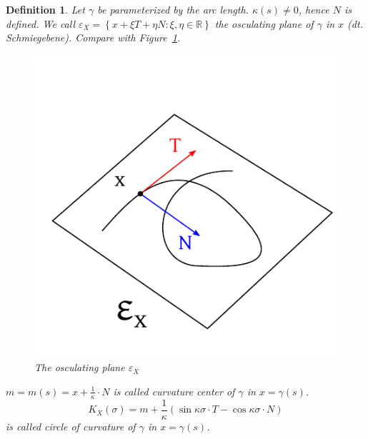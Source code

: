 \documentclass{article}
\newtheorem{definition}{Definition}  \numberwithin{definition}{section}
\newcommand{\set}[1]{\left\{#1\right\}}
\begin{document}
\begin{definition} %
  Let $\gamma$ be parameterized by the arc length.
  $\kappa(s) \neq 0$, hence $N$ is defined. We call $\varepsilon_X = \set{x + \xi T + \eta N: \xi, \eta \in \mathbb R}$
  the \emph{osculating plane} of $\gamma$ in $x$ (dt. \foreignlanguage{german}{Schmiegebene}). Compare with Figure~\ref{img:oscplane}.

  \begin{figure}[t]
    \begin{center}
      \includegraphics{img/51_osculating_plane.pdf}
      \caption{The osculating plane $\varepsilon_X$}
      \label{img:oscplane}
    \end{center}
  \end{figure}

  $m = m(s) = x + \frac{1}{\kappa} \cdot N$ is called curvature center of $\gamma$ in $x = \gamma(s)$.
  \[ K_X(\sigma) = m + \frac{1}{\kappa} (\sin{\kappa \sigma \cdot T} - \cos{\kappa \sigma \cdot N}) \]
  is called \emph{circle of curvature of $\gamma$ in $x = \gamma(s)$}.
\end{definition}
\end{document}
